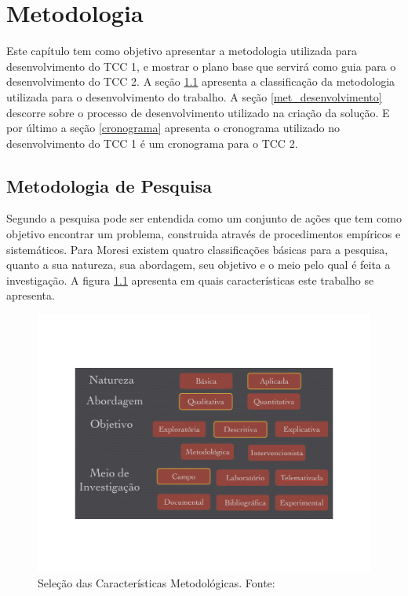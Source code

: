 \chapter[Metodologia]{Metodologia}
Este capítulo tem como objetivo apresentar a metodologia utilizada para desenvolvimento do TCC 1, e mostrar o plano base que servirá como guia para o desenvolvimento do TCC 2. A seção \ref{met_pesquisa} apresenta a classificação da metodologia utilizada para o desenvolvimento do trabalho. A seção \ref{met_desenvolvimento} descorre sobre o processo de desenvolvimento utilizado na criação da solução. E por último a seção  \ref{cronograma} apresenta o cronograma utilizado no desenvolvimento do TCC 1 é um cronograma para o TCC 2.
\section{Metodologia de Pesquisa}
\label{met_pesquisa}
Segundo \cite{moresi_metodologia_2003} a pesquisa pode ser entendida como um conjunto de ações que tem como objetivo encontrar um problema, construida através de procedimentos empíricos e sistemáticos. Para Moresi existem quatro classificações básicas para a pesquisa, quanto a sua natureza, sua abordagem, seu objetivo e o meio pelo qual é feita a investigação. A figura \ref{img:met_pesquisa} apresenta em quais características este trabalho se apresenta.
\graphicspath{{figuras/}}
\begin{figure}[h]
\centering
\includegraphics[scale=0.50]{metodologia_pesquisa}
\caption{Seleção das Características Metodológicas. Fonte: \cite{moresi_metodologia_2003}}
\label{img:met_pesquisa}
\end{figure}

